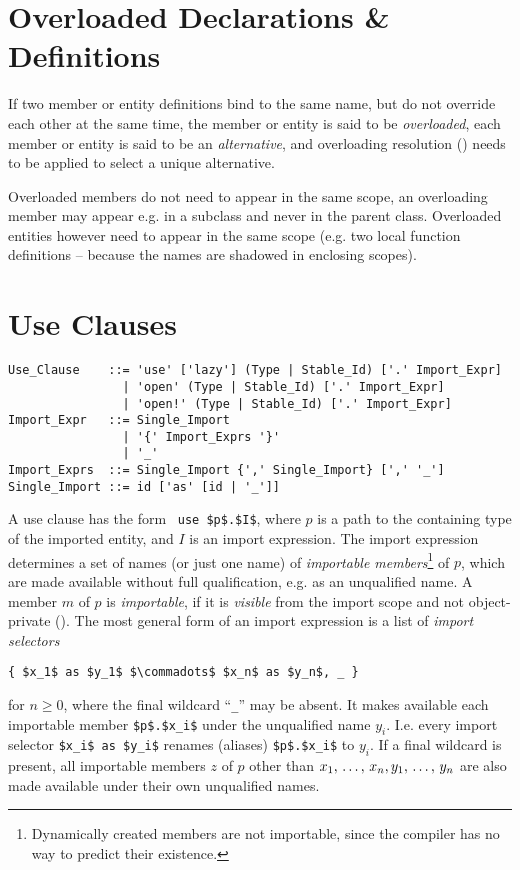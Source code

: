 \section{Overloaded Declarations \& Definitions}
\label{sec:overloaded-definitions}

If two member or entity definitions bind to the same name, but do not override each other at the same time, the member or entity is said to be {\em overloaded}, each member or entity is said to be an {\em alternative}, and overloading resolution () needs to be applied to select a unique alternative. 

Overloaded members do not need to appear in the same scope, an overloading member may appear e.g. in a subclass and never in the parent class. Overloaded entities however need to appear in the same scope (e.g. two local function definitions -- because the names are shadowed in enclosing scopes). 





\section{Use Clauses}
\label{sec:use-clauses}

\syntax\begin{lstlisting}
Use_Clause    ::= 'use' ['lazy'] (Type | Stable_Id) ['.' Import_Expr]
                | 'open' (Type | Stable_Id) ['.' Import_Expr]
                | 'open!' (Type | Stable_Id) ['.' Import_Expr]
Import_Expr   ::= Single_Import
                | '{' Import_Exprs '}'
                | '_'
Import_Exprs  ::= Single_Import {',' Single_Import} [',' '_']
Single_Import ::= id ['as' [id | '_']]
\end{lstlisting}

A use clause has the form ~\lstinline!use $p$.$I$!, where $p$ is a path to the containing type of the imported entity, and $I$ is an import expression. The import expression determines a set of names (or just one name) of {\em importable members}\footnote{Dynamically created members are not importable, since the compiler has no way to predict their existence.} of $p$, which are made available without full qualification, e.g. as an unqualified name. A member $m$ of $p$ is {\em importable}, if it is {\em visible} from the import scope and not object-private (). The most general form of an import expression is a list of {\em import selectors}
\begin{lstlisting}
{ $x_1$ as $y_1$ $\commadots$ $x_n$ as $y_n$, _ }
\end{lstlisting}
for $n \ge 0$, where the final wildcard ``\lstinline!_!'' may be absent. It makes available each importable member \lstinline!$p$.$x_i$! under the unqualified name $y_i$. I.e. every import selector \lstinline!$x_i$ as $y_i$! renames (aliases) \lstinline!$p$.$x_i$! to $y_i$. If a final wildcard is present, all importable members $z$ of $p$ other than $x_1 ,\, \ldots ,\, x_n, y_1 ,\, \ldots ,\, y_n$ are also made available under their own unqualified names. 

